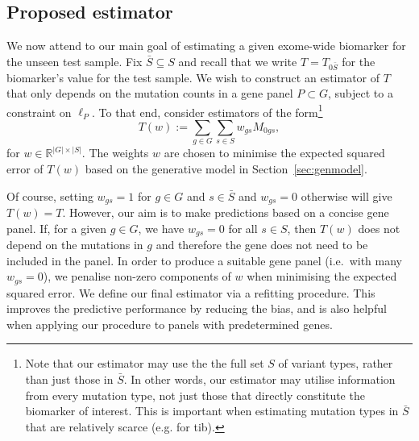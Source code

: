 \documentclass[12pt]{article}
\begin{document}
\subsection{Proposed estimator \label{sec:linearestimator}}
We now attend to our main goal of estimating a given exome-wide biomarker for the unseen test sample. Fix $\bar{S} \subseteq S$ and recall that we write $T = T_{0\bar{S}}$ for the biomarker's value for the test sample. We wish to construct an estimator of $T$ that only depends on the mutation counts in a gene panel $P \subset G$, subject to a constraint on $\ell_P$. To that end, consider estimators of the form\footnote{Note that our estimator may use the the full set $S$ of variant types, rather than just those in $\bar{S}$. In other words, our estimator may utilise information from every mutation type, not just those that directly constitute the biomarker of interest. This is important when estimating mutation types in $\bar{S}$ that are relatively scarce (e.g. for \acrshort{tib}).}
\[
T(w) := \sum_{g \in G} \sum_{s \in S} w_{gs}M_{0gs},
\]
for $w \in \mathbb{R}^{|G|\times |S|}$.  The weights $w$ are chosen to minimise the expected squared error of $T(w)$ based on the generative model in Section~\ref{sec:genmodel}. 

Of course, setting $w_{gs}= 1$ for $g \in G$ and $s \in \bar{S}$ and $w_{gs} = 0$ otherwise will give $T(w) = T$.  However, our aim is to make predictions based on a concise gene panel. If, for a given $g \in G$, we have $w_{gs} = 0$ for all $s \in S$, then $T(w)$ does not depend on the mutations in $g$ and therefore the gene does not need to be included in the panel. In order to produce a suitable gene panel (i.e.~with many $w_{gs} = 0$), we penalise non-zero components of $w$ when minimising the expected squared error. We define our final estimator via a refitting procedure. This improves the predictive performance by reducing the bias, and is also helpful when applying our procedure to panels with predetermined genes.
\end{document}
